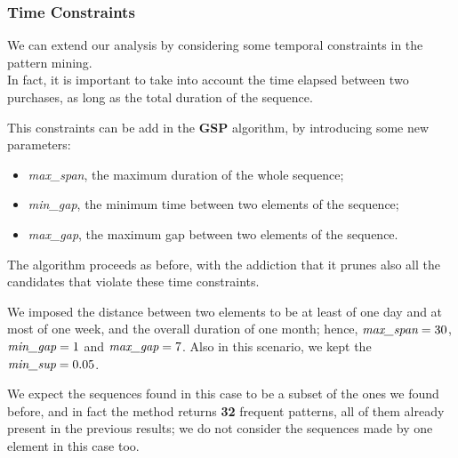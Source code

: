 \subsubsection{Time Constraints}
We can extend our analysis by considering some temporal constraints in the pattern mining.\\
In fact, it is important to take into account the time elapsed between two purchases, as long as the total duration of the sequence. 

This constraints can be add in the \textbf{GSP} algorithm, by introducing some new parameters:
\begin{itemize}
\item \emph{max\_span}, the maximum duration of the whole sequence;
\item \emph{min\_gap}, the minimum time between two elements of the sequence;
\item \emph{max\_gap}, the maximum gap between two elements of the sequence.
\end{itemize}
The algorithm proceeds as before, with the addiction that it prunes also all the candidates that violate these time constraints.

We imposed the distance between two elements to be at least of one day and at most of one week, and the overall duration of one month; hence, $\emph{max\_span} = 30$, $\emph{min\_gap} = 1$ and $\emph{max\_gap} = 7$. Also in this scenario, we kept the $\emph{min\_sup} = 0.05$.

We expect the sequences found in this case to be a subset of the ones we found before, and in fact the method returns \textbf{32} frequent patterns, all of them already present in the previous results; we do not consider the sequences made by one element in this case too. 
